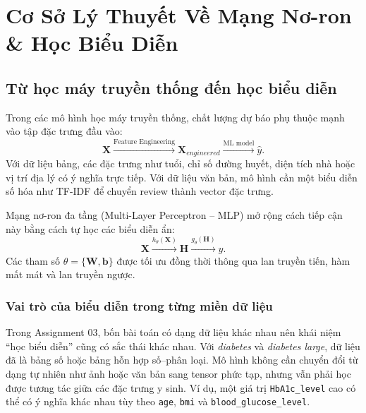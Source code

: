 \documentclass[12pt,a4paper]{report}
\begin{document}
\tableofcontents
\newpage
\listoffigures
\newpage
\listoftables
\newpage
{}

\chapter{Cơ Sở Lý Thuyết Về Mạng Nơ-ron \& Học Biểu Diễn}

\section{Từ học máy truyền thống đến học biểu diễn}
Trong các mô hình học máy truyền thống, chất lượng dự báo phụ thuộc mạnh vào tập đặc trưng đầu vào:
\begin{equation}
    \mathbf{X} \xrightarrow{\text{Feature Engineering}} \mathbf{X}_{engineered}
    \xrightarrow{\text{ML model}} \hat{y}.
\end{equation}
Với dữ liệu bảng, các đặc trưng như tuổi, chỉ số đường huyết, diện tích nhà hoặc vị trí địa lý có ý nghĩa trực tiếp. Với dữ liệu văn bản, mô hình cần một biểu diễn số hóa như TF-IDF để chuyển review thành vector đặc trưng.

Mạng nơ-ron đa tầng (Multi-Layer Perceptron -- MLP) mở rộng cách tiếp cận này bằng cách tự học các biểu diễn ẩn:
\begin{equation}
    \mathbf{X} \xrightarrow{h_{\theta}(\mathbf{X})} \mathbf{H}
    \xrightarrow{g_{\theta}(\mathbf{H})} \hat{y}.
\end{equation}
Các tham số $\theta = \{\mathbf{W}, \mathbf{b}\}$ được tối ưu đồng thời thông qua lan truyền tiến, hàm mất mát và lan truyền ngược.

\subsection{Vai trò của biểu diễn trong từng miền dữ liệu}
Trong Assignment 03, bốn bài toán có dạng dữ liệu khác nhau nên khái niệm ``học biểu diễn'' cũng có sắc thái khác nhau.
Với \textit{diabetes} và \textit{diabetes large}, dữ liệu đã là bảng số hoặc bảng hỗn hợp số--phân loại.
Mô hình không cần chuyển đổi từ dạng tự nhiên như ảnh hoặc văn bản sang tensor phức tạp, nhưng vẫn phải học được tương tác giữa các đặc trưng y sinh.
Ví dụ, một giá trị \texttt{HbA1c\_level} cao có thể có ý nghĩa khác nhau tùy theo \texttt{age}, \texttt{bmi} và \texttt{blood\_glucose\_level}.
\end{document}
